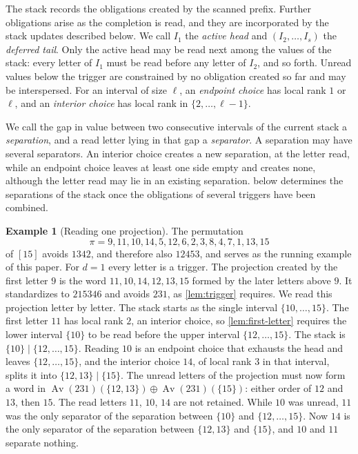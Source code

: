 \documentclass[11pt,reqno]{amsart}
\theoremstyle{definition}
\newtheorem{example}[example]{Example}
\theoremstyle{remark}
\newcommand{\Av}{\operatorname{Av}}
\begin{document}
The stack records the obligations created by the scanned prefix.  Further
obligations arise as the completion is read, and they are incorporated by
the stack updates described below.  We call $I_1$ the \emph{active head} and $(I_2,\ldots,I_s)$ the
\emph{deferred tail}.  Only the active head may be read next among the values
of the stack: every letter of $I_1$ must be read before any letter of
$I_2$, and so forth.  Unread values below the trigger are constrained by no
obligation created so far and may be interspersed.  For an interval of size $\ell$, an
\emph{endpoint choice} has local rank $1$ or $\ell$, and an \emph{interior
choice} has local rank in $\{2,\ldots,\ell-1\}$.

We call the gap in value
between two consecutive intervals of the current stack a \emph{separation},
and a read letter lying in that gap a \emph{separator}.  A separation may
have several separators.  An interior choice creates a new separation, at
the letter read, while an endpoint choice leaves at least one side empty
and creates none, although the letter read may lie in an existing
separation.   below determines the separations of the
stack once the obligations of several triggers have been combined.

\begin{example}[Reading one projection]\label{ex:one-projection}
The permutation
\begin{equation}\label{eq:running-example}
 \pi=9,11,10,14,5,12,6,2,3,8,4,7,1,13,15
\end{equation}
of $[15]$ avoids $1342$, and therefore also $12453$, and serves as the
running example of this paper.  For $d=1$ every letter is a trigger.  The
projection created by the first letter $9$ is the word
$11,10,14,12,13,15$ formed by the later letters above $9$.  It
standardizes to $215346$ and avoids $231$, as \cref{lem:trigger} requires.
We read this projection letter by letter.  The stack starts as the single
interval $\{10,\ldots,15\}$.  The first letter $11$ has local rank $2$, an
interior choice, so \cref{lem:first-letter} requires the lower interval
$\{10\}$ to be read before the upper interval $\{12,\ldots,15\}$.  The stack
is $\{10\}\mid\{12,\ldots,15\}$.  Reading $10$ is an endpoint choice that
exhausts the head and leaves $\{12,\ldots,15\}$, and the interior choice
$14$, of local rank $3$ in that interval, splits it into
$\{12,13\}\mid\{15\}$.  The unread letters of the projection must now form
a word in $\Av(231)(\{12,13\})\oplus\Av(231)(\{15\})$: either order of $12$
and $13$, then $15$.  The read letters $11$, $10$, $14$ are not retained.
While $10$
was unread, $11$ was the only separator of the separation between $\{10\}$
and $\{12,\ldots,15\}$.  Now $14$ is the only separator of the separation
between $\{12,13\}$ and $\{15\}$, and $10$ and $11$ separate nothing.
\end{example}
\end{document}
